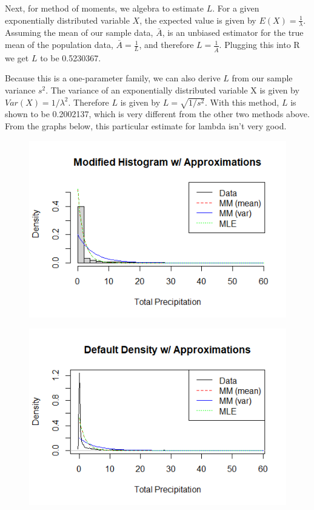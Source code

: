 \documentclass[12pt, a4paper, oneside]{report}
\begin{document}

Next, for method of moments, we algebra to estimate \(L\).
For a given exponentially distributed variable \(X\), the expected value is given by \(E(X) = \frac{1}{\lambda}\). Assuming the mean of our sample data, \(\bar{A}\), is an unbiased estimator for the true mean of the population data, \(\bar{A} = \frac{1}{L}\), and therefore \(L = \frac{1}{\bar{A}}\).
Plugging this into R we get \(L\) to be 0.5230367.


Because this is a one-parameter family, we can also derive \(L\) from our sample variance \(s^2\). The variance of an exponentially distributed variable X is given by \(Var(X) = 1 / \lambda^2\). Therefore \(L\) is given by \(L = \sqrt{1 / s^2}\).
With this method, \(L\) is shown to be 0.2002137, which is very different from the other two methods above. From the graphs below, this particular estimate for lambda isn't very good. 

\begin{figure}[h]
  \centering
  \includegraphics[width=0.8\linewidth]{expHistModifiedA.png}
\end{figure}

\begin{figure}[h]
  \centering
  \includegraphics[width=0.8\linewidth]{expDensityDefaultA.png}
\end{figure}
\end{document}
